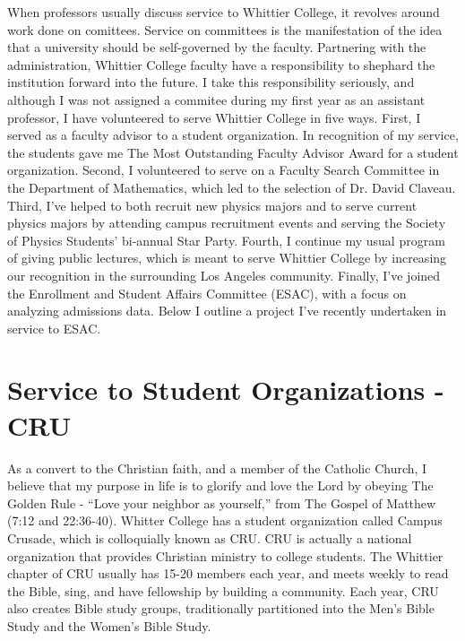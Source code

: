 \documentclass[../main.tex]{subfiles}
\begin{document}
When professors usually discuss service to Whittier College, it revolves around work done on comittees.  Service on committees is the manifestation of the idea that a university should be self-governed by the faculty.  Partnering with the administration, Whittier College faculty have a responsibility to shephard the institution forward into the future.  I take this responsibility seriously, and although I was not assigned a commitee during my first year as an assistant professor, I have volunteered to serve Whittier College in five ways.  First, I served as a faculty advisor to a student organization.  In recognition of my service, the students gave me The Most Outstanding Faculty Advisor Award for a student organization.  Second, I volunteered to serve on a Faculty Search Committee in the Department of Mathematics, which led to the selection of Dr. David Claveau.  Third, I've helped to both recruit new physics majors and to serve current physics majors by attending campus recruitment events and serving the Society of Physics Students' bi-annual Star Party.  Fourth, I continue my usual program of giving public lectures, which is meant to serve Whittier College by increasing our recognition in the surrounding Los Angeles community.  Finally, I've joined the Enrollment and Student Affairs Committee (ESAC), with a focus on analyzing admissions data.  Below I outline a project I've recently undertaken in service to ESAC. \\ \hspace{0.1cm}

\section{Service to Student Organizations - CRU}

As a convert to the Christian faith, and a member of the Catholic Church, I believe that my purpose in life is to glorify and love the Lord by obeying The Golden Rule - ``Love your neighbor as yourself,'' from The Gospel of Matthew (7:12 and 22:36-40).  Whitter College has a student organization called Campus Crusade, which is colloquially known as CRU.  CRU is actually a national organization that provides Christian ministry to college students.  The Whittier chapter of CRU usually has 15-20 members each year, and meets weekly to read the Bible, sing, and have fellowship by building a community.  Each year, CRU also creates Bible study groups, traditionally partitioned into the Men's Bible Study and the Women's Bible Study. \\ \hspace{0.1cm}
\end{document}
